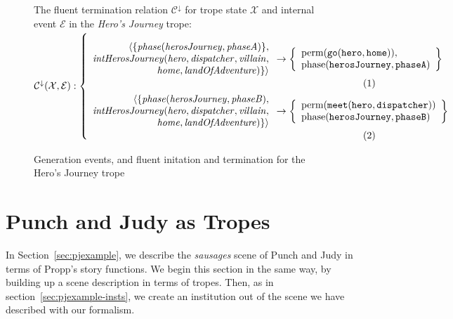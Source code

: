 \documentclass[11pt]{report}
\begin{document}
\begin{figure}[!t]
The fluent termination relation $\mathcal{C^{\downarrow}}$ for trope state $\mathcal{X}$ and internal event $\mathcal{E}$ in the \emph{Hero's Journey} trope:\\
$\mathcal{C^{\downarrow} (X, E)}:\left\{\mbox{%
\begin{minipage}[c]{0.85\textwidth}
\begin{align}
\begin{array}{r}
                                 \langle \{\mathit{phase(herosJourney, phaseA)}\},\\
  \mathit{intHerosJourney(hero, dispatcher, villain},\\ \mathit{home, landOfAdventure)}\} \rangle
  \end{array}
&\rightarrow \left\{
\begin{array}{l}\text{perm}(\mathtt{go(hero, home)}),\\
\text{phase}(\mathtt{herosJourney, phaseA})
\end{array}
\right\}\label{eq:crt}\\
\begin{array}{r}
                                 \langle\{\mathit{phase(herosJourney, phaseB)},\\
  \mathit{intHerosJourney(hero, dispatcher, villain},\\ \mathit{home, landOfAdventure)}\} \rangle
  \end{array}
&\rightarrow \left\{
\begin{array}{l}
\text{perm}(\mathtt{meet(hero, dispatcher)})\\
\text{phase}(\mathtt{herosJourney, phaseB})
\end{array}
\right\}\label{eq:crst}
\end{align}
\end{minipage}
}\right.$
\caption{Generation events, and fluent initation and termination for the Hero's Journey trope}
\label{fig:gen}
\label{fig:init}
\label{fig:term}
\end{figure}

\section{Punch and Judy as Tropes}
\label{sec:punchjudy-tropes}
In Section~\ref{sec:pjexample}, we describe the \emph{sausages} scene of Punch
and Judy in terms of Propp's story functions. We begin this section in the same
way, by building up a scene description in terms of tropes. Then, as in
section~\ref{sec:pjexample-insts}, we create an institution out of the scene we
have described with our formalism. 
\end{document}
